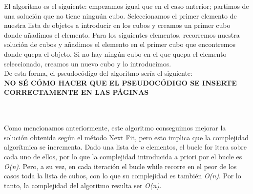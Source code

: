 \documentclass[a4paper, 12pt, oneside]{book}
\begin{document}
	El algoritmo es el siguiente: empezamos igual que en el caso anterior; partimos de una soluci\'on que no tiene ningu\'un cubo. Seleccionamos el primer elemento de nuestra lista de objetos a introducir en los cubos y creamos un primer cubo donde a\~{n}adimos el elemento. Para los siguientes elementos, recorremos nuestra soluci\'on de cubos y a\~{n}adimos el elemento en el primer cubo que encontremos donde quepa el objeto. Si no hay ning\'un cubo en el que quepa el elemento seleccionado, creamos un nuevo cubo y lo introducimos.
	\\
	
	De esta forma, el pseudoc\'odigo del algoritmo ser\'ia el siguiente:
	\\
	
	\textbf{NO S\'E C\'OMO HACER QUE EL PSEUDOC\'ODIGO SE INSERTE CORRECTAMENTE EN LAS P\'AGINAS}
	
	\noindent{}
	\\\\
	
	Como mencionamos anteriormente, este algoritmo conseguimos mejorar la soluci\'on obtenida seg\'un el m\'etodo Next Fit, pero esto implica que la complejidad algor\'itmica se incrementa. Dado una lista de \textit{n} elementos, el bucle for itera sobre cada uno de ellos, por lo que la complejidad introducida a priori por el bucle es \textit{O(n)}. Pero, a su vez, en cada iteraci\'on el bucle while recorre en el peor de los casos toda la lista de cubos, con lo que su complejidad es tambi\'en \textit{O(n)}. Por lo tanto, la complejidad del algoritmo resulta ser \textit{O(n)}.
	\\
	
\end{document}
